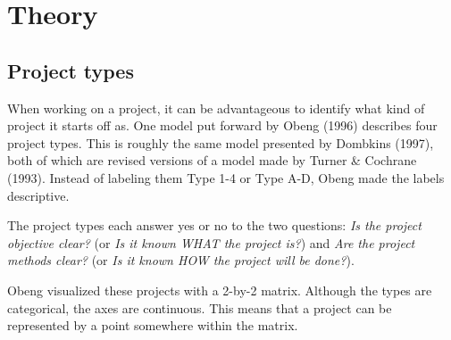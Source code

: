 \chapter{Theory}

\section{Project types}
When working on a project, it can be advantageous to identify what kind of project it starts off as. One model put forward by Obeng (1996) describes four project types. This is roughly the same model presented by Dombkins (1997), both of which are revised versions of a model made by Turner \& Cochrane (1993). Instead of labeling them Type 1-4 or Type A-D, Obeng made the labels descriptive.

The project types each answer yes or no to the two questions: \textit{Is the project objective clear?} (or \textit{Is it known WHAT the project is?}) and \textit{Are the project methods clear?} (or \textit{Is it known HOW the project will be done?}).

\begin{table}[H]
\caption{Turner \& Cochrane, Dombkins and Obeng described the same type of project differently.}
\label{obengtable}
\end{table}

Obeng visualized these projects with a 2-by-2 matrix. Although the types are categorical, the axes are continuous. This means that a project can be represented by a point somewhere within the matrix.

